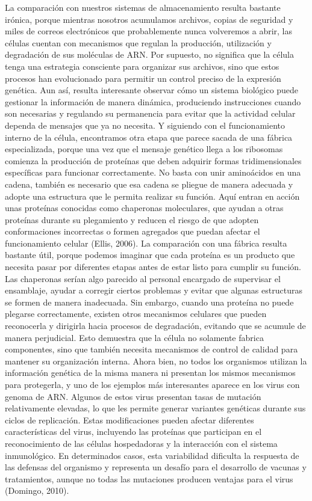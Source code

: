 \documentclass[12pt]{article}
\begin{document}
La comparación con nuestros sistemas de almacenamiento resulta bastante irónica, porque mientras nosotros acumulamos archivos, copias de seguridad y miles de correos electrónicos que probablemente nunca volveremos a abrir, las células cuentan con mecanismos que regulan la producción, utilización y degradación de sus moléculas de ARN. Por supuesto, no significa que la célula tenga una estrategia consciente para organizar sus archivos, sino que estos procesos han evolucionado para permitir un control preciso de la expresión genética. Aun así, resulta interesante observar cómo un sistema biológico puede gestionar la información de manera dinámica, produciendo instrucciones cuando son necesarias y regulando su permanencia para evitar que la actividad celular dependa de mensajes que ya no necesita.
Y siguiendo con el funcionamiento interno de la célula, encontramos otra etapa que parece sacada de una fábrica especializada, porque una vez que el mensaje genético llega a los ribosomas comienza la producción de proteínas que deben adquirir formas tridimensionales específicas para funcionar correctamente. No basta con unir aminoácidos en una cadena, también es necesario que esa cadena se pliegue de manera adecuada y adopte una estructura que le permita realizar su función. Aquí entran en acción unas proteínas conocidas como chaperonas moleculares, que ayudan a otras proteínas durante su plegamiento y reducen el riesgo de que adopten conformaciones incorrectas o formen agregados que puedan afectar el funcionamiento celular (Ellis, 2006).
La comparación con una fábrica resulta bastante útil, porque podemos imaginar que cada proteína es un producto que necesita pasar por diferentes etapas antes de estar listo para cumplir su función. Las chaperonas serían algo parecido al personal encargado de supervisar el ensamblaje, ayudar a corregir ciertos problemas y evitar que algunas estructuras se formen de manera inadecuada. Sin embargo, cuando una proteína no puede plegarse correctamente, existen otros mecanismos celulares que pueden reconocerla y dirigirla hacia procesos de degradación, evitando que se acumule de manera perjudicial. Esto demuestra que la célula no solamente fabrica componentes, sino que también necesita mecanismos de control de calidad para mantener su organización interna.
Ahora bien, no todos los organismos utilizan la información genética de la misma manera ni presentan los mismos mecanismos para protegerla, y uno de los ejemplos más interesantes aparece en los virus con genoma de ARN. Algunos de estos virus presentan tasas de mutación relativamente elevadas, lo que les permite generar variantes genéticas durante sus ciclos de replicación. Estas modificaciones pueden afectar diferentes características del virus, incluyendo las proteínas que participan en el reconocimiento de las células hospedadoras y la interacción con el sistema inmunológico. En determinados casos, esta variabilidad dificulta la respuesta de las defensas del organismo y representa un desafío para el desarrollo de vacunas y tratamientos, aunque no todas las mutaciones producen ventajas para el virus (Domingo, 2010).
\end{document}
